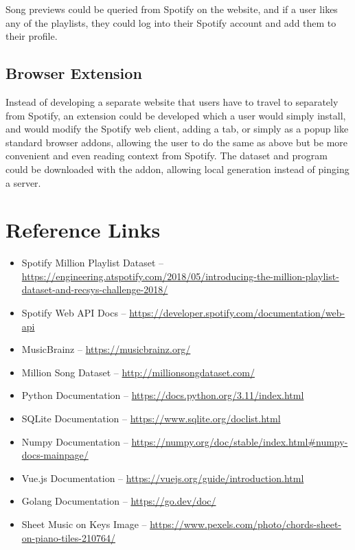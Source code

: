 \documentclass[a4paper, 12pt]{report}
\begin{document}
Song previews could be queried from Spotify on the website, and if a user likes any of the playlists, they could log into their Spotify account
and add them to their profile.

\section{Browser Extension}
Instead of developing a separate website that users have to travel to separately from Spotify, an extension could be developed which a user would simply install,
and would modify the Spotify web client, adding a tab, or simply as a popup like standard browser addons, allowing the user to do the same as above but be
more convenient and even reading context from Spotify. The dataset and program could be downloaded with the addon, allowing local generation instead of pinging a server.

\printbibliography

\chapter*{Reference Links}
\normalsize{
\begin{itemize}
    \item Spotify Million Playlist Dataset -- \url{https://engineering.atspotify.com/2018/05/introducing-the-million-playlist-dataset-and-recsys-challenge-2018/}
    \item Spotify Web API Docs -- \url{https://developer.spotify.com/documentation/web-api}
    \\
    \item MusicBrainz -- \url{https://musicbrainz.org/}
    \item Million Song Dataset -- \url{http://millionsongdataset.com/}
    \\
    \item Python Documentation -- \url{https://docs.python.org/3.11/index.html}
    \item SQLite Documentation -- \url{https://www.sqlite.org/doclist.html}
    \item Numpy Documentation -- \url{https://numpy.org/doc/stable/index.html#numpy-docs-mainpage/}
    \item Vue.js Documentation -- \url{https://vuejs.org/guide/introduction.html}
    \item Golang Documentation -- \url{https://go.dev/doc/}
    \\
    \item Sheet Music on Keys Image -- \url{https://www.pexels.com/photo/chords-sheet-on-piano-tiles-210764/}
\end{itemize}
}
\end{document}
